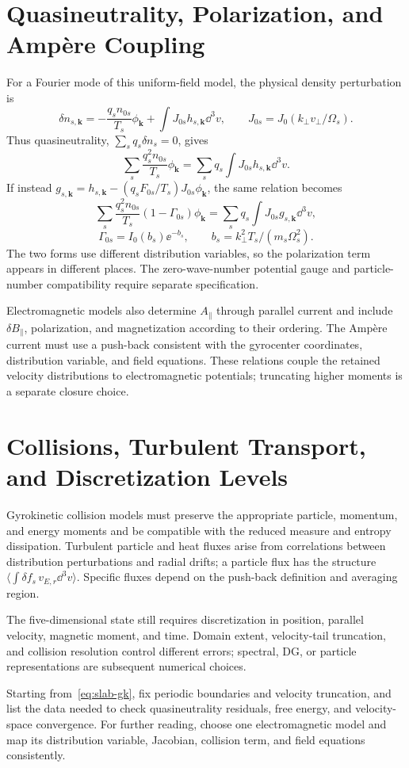 \section{Quasineutrality, Polarization, and Amp\`ere Coupling}
For a Fourier mode of this uniform-field model, the physical density perturbation is
\[
\delta n_{s,\bm k}
=-\frac{q_sn_{0s}}{T_s}\phi_{\bm k}
+\int J_{0s}h_{s,\bm k}\dd^3v,\qquad
J_{0s}=J_0(k_\perp v_\perp/\Omega_s).
\]
Thus quasineutrality, $\sum_sq_s\delta n_s=0$, gives
\begin{equation}\label{eq:gk-qn}
\sum_s\frac{q_s^2n_{0s}}{T_s}\phi_{\bm k}
=\sum_sq_s\int J_{0s}h_{s,\bm k}\dd^3v.
\end{equation}
If instead $g_{s,\bm k}=h_{s,\bm k}-(q_sF_{0s}/T_s)J_{0s}\phi_{\bm k}$,
the same relation becomes
\[
\sum_s\frac{q_s^2n_{0s}}{T_s}(1-\Gamma_{0s})\phi_{\bm k}
=\sum_sq_s\int J_{0s}g_{s,\bm k}\dd^3v,
\]
\[
\Gamma_{0s}=I_0(b_s)\ee^{-b_s},\qquad
b_s=k_\perp^2T_s/(m_s\Omega_s^2).
\]
The two forms use different distribution variables, so the polarization term appears in different places.
The zero-wave-number potential gauge and particle-number compatibility require separate specification.

Electromagnetic models also determine $A_\parallel$ through parallel current
and include $\delta B_\parallel$, polarization, and magnetization according to their ordering.
The Amp\`ere current must use a push-back consistent with the gyrocenter coordinates, distribution variable, and field equations.
These relations couple the retained velocity distributions to electromagnetic potentials; truncating higher moments is a separate closure choice.

\section{Collisions, Turbulent Transport, and Discretization Levels}
Gyrokinetic collision models must preserve the appropriate particle, momentum, and energy moments
and be compatible with the reduced measure and entropy dissipation. Turbulent particle and heat fluxes arise from correlations between distribution perturbations and radial drifts;
a particle flux has the structure $\langle\int\delta f_s\,v_{E,r}\dd^3v\rangle$.
Specific fluxes depend on the push-back definition and averaging region.

The five-dimensional state still requires discretization in position, parallel velocity, magnetic moment, and time.
Domain extent, velocity-tail truncation, and collision resolution control different errors;
spectral, DG, or particle representations are subsequent numerical choices.

{Starting from~\eqref{eq:slab-gk}, fix periodic boundaries and velocity truncation, and list the data needed to check quasineutrality residuals, free energy, and velocity-space convergence. For further reading, choose one electromagnetic model and map its distribution variable, Jacobian, collision term, and field equations consistently.}
